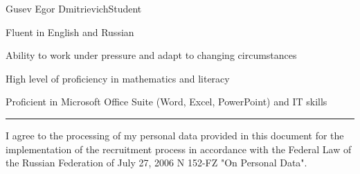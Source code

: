\documentclass{article}
\begin{document}
\begin{cv}[avatar]{Gusev Egor Dmitrievich}{Student}

\begin{cvitem}
    Fluent in English and Russian
\end{cvitem}

\cvseparator
\begin{cvitem}
    Ability to work under pressure and adapt to changing circumstances
\end{cvitem}

\cvseparator
\begin{cvitem}
    High level of proficiency in mathematics and literacy
\end{cvitem}

\cvseparator
\begin{cvitem}
    Proficient in Microsoft Office Suite (Word, Excel, PowerPoint) and IT skills
\end{cvitem}


\end{cv}

\vfill %
\hrule %
\begin{center} %
\tiny %
I agree to the processing of my personal data provided in this document for the implementation of the recruitment process in accordance with the Federal Law of the Russian Federation of July 27, 2006 N 152-FZ "On Personal Data".
\end{center} %
\end{document}
